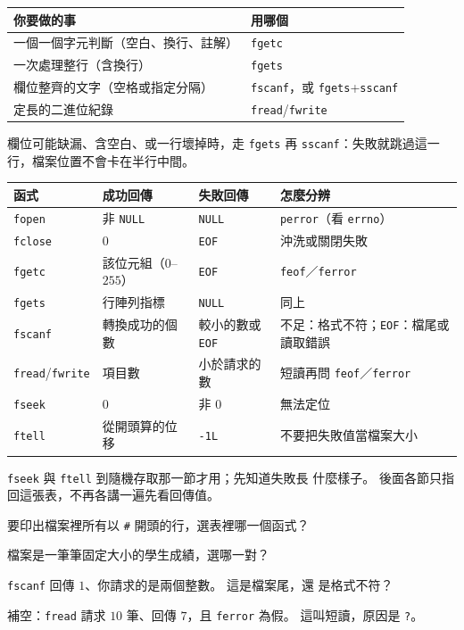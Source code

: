 \begin{center}
\begin{tabular}{|l|l|}
\hline
你要做的事 & 用哪個 \\
\hline
一個一個字元判斷（空白、換行、註解） & \texttt{fgetc} \\
一次處理整行（含換行） & \texttt{fgets} \\
欄位整齊的文字（空格或指定分隔） & \texttt{fscanf}，或 \texttt{fgets}+\texttt{sscanf} \\
定長的二進位紀錄 & \texttt{fread}/\texttt{fwrite} \\
\hline
\end{tabular}
\end{center}

欄位可能缺漏、含空白、或一行壞掉時，走 \texttt{fgets} 再
\texttt{sscanf}：失敗就跳過這一行，檔案位置不會卡在半行中間。

\begin{center}
\small
\begin{tabular}{|l|l|l|p{4.6cm}|}
\hline
函式 & 成功回傳 & 失敗回傳 & 怎麼分辨 \\
\hline
\texttt{fopen} & 非 \texttt{NULL} & \texttt{NULL} & \texttt{perror}（看 \texttt{errno}） \\
\texttt{fclose} & $0$ & \texttt{EOF} & 沖洗或關閉失敗 \\
\texttt{fgetc} & 該位元組（$0$--$255$） & \texttt{EOF} & \texttt{feof}／\texttt{ferror} \\
\texttt{fgets} & 行陣列指標 & \texttt{NULL} & 同上 \\
\texttt{fscanf} & 轉換成功的個數 & 較小的數或 \texttt{EOF} &
  不足：格式不符；\texttt{EOF}：檔尾或讀取錯誤 \\
\texttt{fread}/\texttt{fwrite} & 項目數 & 小於請求的數 &
  短讀再問 \texttt{feof}／\texttt{ferror} \\
\texttt{fseek} & $0$ & 非 $0$ & 無法定位 \\
\texttt{ftell} & 從開頭算的位移 & \texttt{-1L} & 不要把失敗值當檔案大小 \\
\hline
\end{tabular}
\end{center}

\texttt{fseek} 與 \texttt{ftell} 到隨機存取那一節才用；先知道失敗長
什麼樣子。 後面各節只指回這張表，不再各講一遍先看回傳值。


\begin{drills}[label=drills:fio-toolbox]
\item 要印出檔案裡所有以 \texttt{\#} 開頭的行，選表裡哪一個函式？
\item 檔案是一筆筆固定大小的學生成績，選哪一對？
\item \texttt{fscanf} 回傳 $1$、你請求的是兩個整數。 這是檔案尾，還
是格式不符？
\item 補空：\texttt{fread} 請求 $10$ 筆、回傳 $7$，且
\texttt{ferror} 為假。 這叫短讀，原因是 \texttt{?}。
\end{drills}

